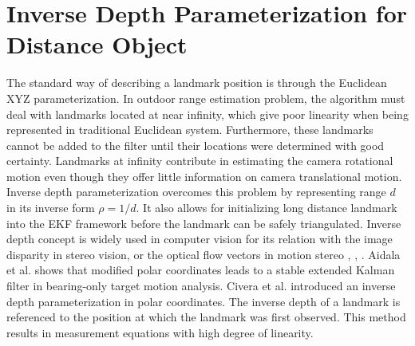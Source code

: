 \section{Inverse Depth Parameterization for Distance Object}
The standard way of describing a landmark position is through the
Euclidean XYZ parameterization. In outdoor range estimation problem,
the algorithm must deal with landmarks located at near infinity, which
give poor linearity when being represented in traditional Euclidean
system. Furthermore, these landmarks cannot be added to the filter
until their locations were determined with good certainty. Landmarks
at infinity contribute in estimating the camera rotational motion even
though they offer little information on camera translational motion.
Inverse depth parameterization overcomes this problem by representing
range $d$ in its inverse form $\rho =1/d$. It also allows for
initializing long distance landmark into the EKF framework before the
landmark can be safely triangulated. Inverse depth concept is widely
used in computer vision for its relation with the image disparity in
stereo vision, or the optical flow vectors in motion stereo
\cite{okutomi_multiple-baseline_1991}, \cite{jepson_fast_1991},
\cite{chowdhury_stochastic_2003}. Aidala et al.
\cite{aidala_utilization_1983} shows that modified polar coordinates
leads to a stable extended Kalman filter in bearing-only target motion
analysis. Civera et al. \cite{civera_inverse_2008} introduced an
inverse depth parameterization in polar coordinates. The inverse depth
of a landmark is referenced to the position at which the landmark was
first observed. This method results in measurement equations with high
degree of linearity.





